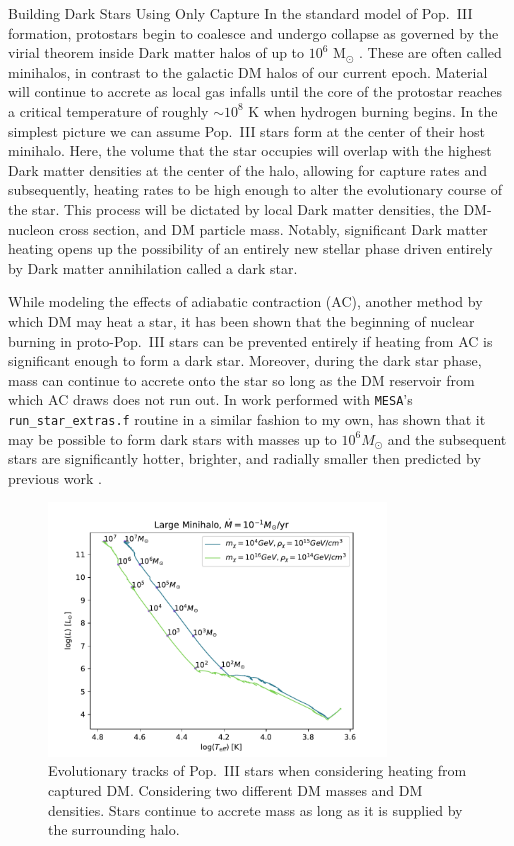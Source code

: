 \documentclass[a4paper,11pt]{article}
\begin{document}
\begin{section}{Building Dark Stars Using Only Capture}
    In the standard model of Pop.~III formation, protostars begin to coalesce and undergo collapse as governed by the virial theorem inside Dark matter halos of up to $10^6$ M$_{\odot}$ \cite{Freese:2016dark}.
    These are often called minihalos, in contrast to the galactic DM halos of our current epoch.
    Material will continue to accrete as local gas infalls until the core of the protostar reaches a critical temperature of roughly $\sim10^8$ K when hydrogen burning begins.
    In the simplest picture we can assume Pop.~III stars form at the center of their host minihalo.
    Here, the volume that the star occupies will overlap with the highest Dark matter densities at the center of the halo, allowing for capture rates and subsequently, heating rates to be high enough to alter the evolutionary course of the star.
    This process will be dictated by local Dark matter densities, the DM-nucleon cross section, and DM particle mass.
    Notably, significant Dark matter heating opens up the possibility of an entirely new stellar phase driven entirely by Dark matter annihilation called a dark star.

    While modeling the effects of adiabatic contraction (AC), another method by which DM may heat a star, it has been shown that the beginning of nuclear burning in proto-Pop.~III stars can be prevented entirely if heating from AC is significant enough to form a dark star.
    Moreover, during the dark star phase, mass can continue to accrete onto the star so long as the DM reservoir from which AC draws does not run out.
    In work performed with \texttt{MESA}'s \texttt{run\_star\_extras.f} routine in a similar fashion to my own, has shown that it may be possible to form dark stars with masses up to $10^6 M_{\odot}$ and the subsequent stars are significantly hotter, brighter, and radially smaller then predicted by previous work \cite{Rindler-Daller:2015} \cite{Rindler-Daller:2020}.
    \begin{figure}
        \centering
        \includegraphics[trim={0 0.2cm 0 0.6cm},clip,width=0.8\textwidth]{hr.pdf}
        \caption{Evolutionary tracks of Pop.~III stars when considering heating from captured DM. Considering two different DM masses and DM densities. Stars continue to accrete mass as long as it is supplied by the surrounding halo.}
    \end{figure}


\end{section}
\end{document}
